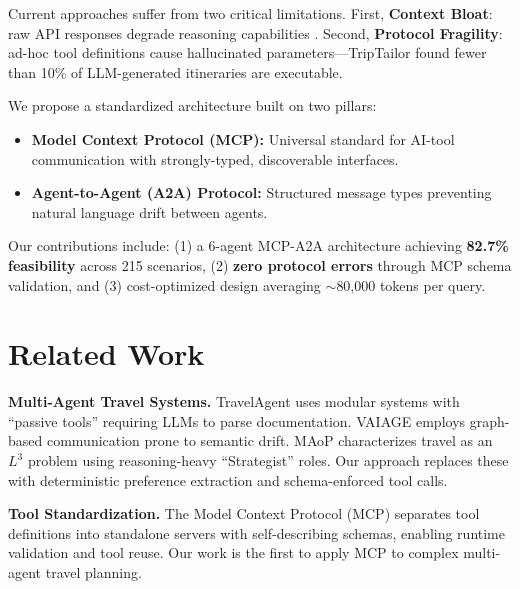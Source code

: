 \documentclass[conference]{IEEEtran}
\begin{document}
Current approaches suffer from two critical limitations. First, \textbf{Context Bloat}: raw API responses degrade reasoning capabilities \cite{chen2024travelagent}. Second, \textbf{Protocol Fragility}: ad-hoc tool definitions cause hallucinated parameters---TripTailor \cite{shen2025triptailor} found fewer than 10\% of LLM-generated itineraries are executable.

We propose a standardized architecture built on two pillars:
\begin{itemize}
    \item \textbf{Model Context Protocol (MCP):} Universal standard for AI-tool communication with strongly-typed, discoverable interfaces.
    \item \textbf{Agent-to-Agent (A2A) Protocol:} Structured message types preventing natural language drift between agents.
\end{itemize}

Our contributions include: (1) a 6-agent MCP-A2A architecture achieving \textbf{82.7\% feasibility} across 215 scenarios, (2) \textbf{zero protocol errors} through MCP schema validation, and (3) cost-optimized design averaging $\sim$80,000 tokens per query.

\section{Related Work}

\textbf{Multi-Agent Travel Systems.} TravelAgent \cite{chen2024travelagent} uses modular systems with ``passive tools'' requiring LLMs to parse documentation. VAIAGE \cite{ge2025vaiage} employs graph-based communication prone to semantic drift. MAoP \cite{yang2025planyourtravel} characterizes travel as an $L^3$ problem using reasoning-heavy ``Strategist'' roles. Our approach replaces these with deterministic preference extraction and schema-enforced tool calls.

\textbf{Tool Standardization.} The Model Context Protocol (MCP) separates tool definitions into standalone servers with self-describing schemas, enabling runtime validation and tool reuse. Our work is the first to apply MCP to complex multi-agent travel planning.

\end{document}
